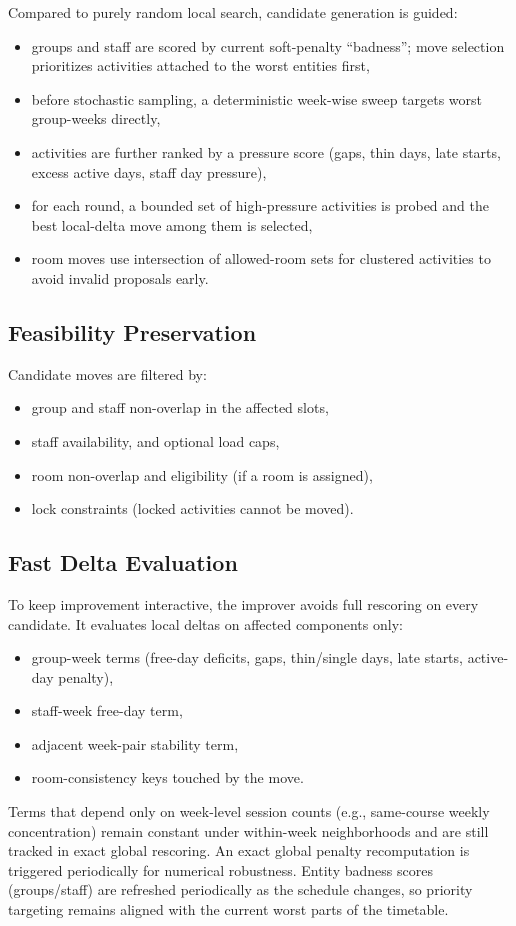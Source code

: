 \noindent
Compared to purely random local search, candidate generation is guided:
\begin{itemize}[leftmargin=*]
  \item groups and staff are scored by current soft-penalty ``badness''; move selection prioritizes activities attached to the worst entities first,
  \item before stochastic sampling, a deterministic week-wise sweep targets worst group-weeks directly,
  \item activities are further ranked by a pressure score (gaps, thin days, late starts, excess active days, staff day pressure),
  \item for each round, a bounded set of high-pressure activities is probed and the best local-delta move among them is selected,
  \item room moves use intersection of allowed-room sets for clustered activities to avoid invalid proposals early.
\end{itemize}

\subsection{Feasibility Preservation}
Candidate moves are filtered by:
\begin{itemize}[leftmargin=*]
  \item group and staff non-overlap in the affected slots,
  \item staff availability, and optional load caps,
  \item room non-overlap and eligibility (if a room is assigned),
  \item lock constraints (locked activities cannot be moved).
\end{itemize}

\subsection{Fast Delta Evaluation}
To keep improvement interactive, the improver avoids full rescoring on every candidate.
It evaluates local deltas on affected components only:
\begin{itemize}[leftmargin=*]
  \item group-week terms (free-day deficits, gaps, thin/single days, late starts, active-day penalty),
  \item staff-week free-day term,
  \item adjacent week-pair stability term,
  \item room-consistency keys touched by the move.
\end{itemize}
Terms that depend only on week-level session counts (e.g., same-course weekly concentration)
remain constant under within-week neighborhoods and are still tracked in exact global rescoring.
An exact global penalty recomputation is triggered periodically for numerical robustness.
Entity badness scores (groups/staff) are refreshed periodically as the schedule changes, so priority targeting remains aligned with the current worst parts of the timetable.

